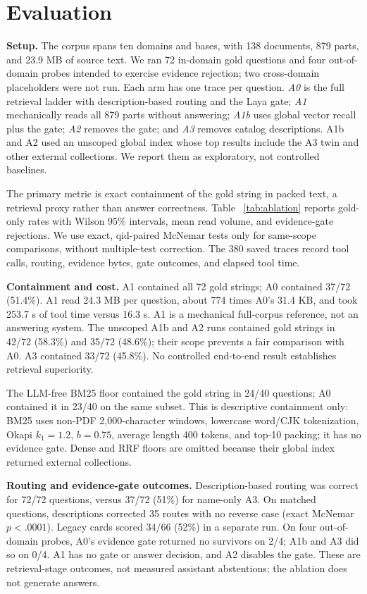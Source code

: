 \section{Evaluation}
\label{sec:eval}

\textbf{Setup.}
The corpus spans ten domains and bases, with 138 documents, 879 parts,
and 23.9 MB of source text. We ran 72 in-domain gold questions and four
out-of-domain probes intended to exercise evidence rejection; two
cross-domain placeholders were not run.
Each arm has one trace per question. \emph{A0} is the full retrieval
ladder with description-based routing and the Laya gate; \emph{A1}
mechanically reads all 879 parts without answering; \emph{A1b} uses
global vector recall plus the gate; \emph{A2} removes the gate; and
\emph{A3} removes catalog descriptions. A1b and A2 used an unscoped
global index whose top results include the A3 twin and other external
collections. We report them as exploratory, not controlled baselines.

The primary metric is exact containment of the gold string in packed
text, a retrieval proxy rather than answer correctness. Table
~\ref{tab:ablation} reports gold-only rates with Wilson 95\% intervals,
mean read volume, and evidence-gate rejections. We use exact, qid-paired McNemar
tests only for same-scope comparisons, without multiple-test correction.
The 380 saved traces record tool calls, routing, evidence bytes, gate
outcomes, and elapsed tool time.

\textbf{Containment and cost.}
A1 contained all 72 gold strings; A0 contained 37/72 (51.4\%). A1 read
24.3 MB per question, about 774 times A0's 31.4 KB, and took 253.7 s
of tool time versus 16.3 s. A1 is a mechanical full-corpus reference,
not an answering system. The unscoped A1b and A2 runs contained gold
strings in 42/72 (58.3\%) and 35/72 (48.6\%); their scope prevents a
fair comparison with A0. A3 contained 33/72 (45.8\%). No controlled
end-to-end result establishes retrieval superiority.

The LLM-free BM25 floor contained the gold string in 24/40 questions;
A0 contained it in 23/40 on the same subset. This is descriptive
containment only: BM25 uses non-PDF 2,000-character windows, lowercase
word/CJK tokenization, Okapi $k_1{=}1.2$, $b{=}0.75$, average length
400 tokens, and top-10 packing; it has no evidence gate. Dense and RRF
floors are omitted because their global index returned external
collections.

\textbf{Routing and evidence-gate outcomes.}
Description-based routing was correct for 72/72 questions, versus
37/72 (51\%) for name-only A3. On matched questions, descriptions
corrected 35 routes with no reverse case (exact McNemar $p<.0001$).
Legacy cards scored 34/66 (52\%) in a separate run. On four
out-of-domain probes, A0's evidence gate returned no survivors on 2/4;
A1b and A3 did so on 0/4. A1 has no gate or answer decision, and A2
disables the gate. These are retrieval-stage outcomes, not measured
assistant abstentions; the ablation does not generate answers.

